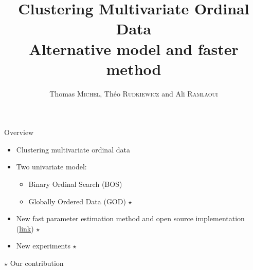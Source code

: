 \documentclass{beamer}
\author[]{Thomas \textsc{Michel}, Théo \textsc{Rudkiewicz} and Ali \textsc{Ramlaoui}}
\title[Clustering Multivariate Ordinal Data]{Clustering Multivariate Ordinal Data\\Alternative model and faster method}
\begin{document}
\frame{\titlepage}

\begin{frame}{Overview}
    \begin{itemize}
        \item Clustering multivariate ordinal data
        \item Two univariate model: \begin{itemize}
                  \item Binary Ordinal Search (BOS)
                  \item Globally Ordered Data (GOD) $\star$
              \end{itemize}
        \item New fast parameter estimation method and open source implementation (\hyperlink{https://github.com/Thomick/Ordinal-data-clustering}{link}) $\star$
        \item New experiments $\star$
    \end{itemize}

    \hfill\small $\star$ Our contribution
\end{frame}
\end{document}
